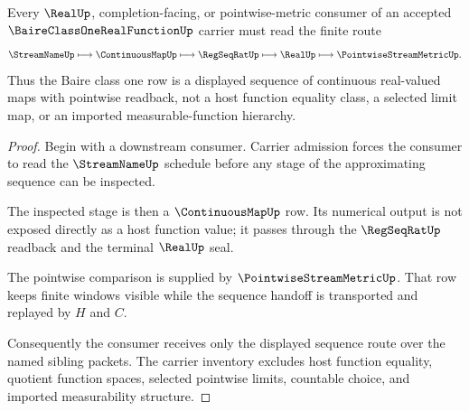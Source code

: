 \begin{theorem}
\label{thm:baire-class-one-real-function-sequence-handoff}
Every $\RealUp$, completion-facing, or pointwise-metric consumer of an accepted $\BaireClassOneRealFunctionUp$ carrier must read the finite route
$$
\StreamNameUp
\longmapsto
\ContinuousMapUp
\longmapsto
\RegSeqRatUp
\longmapsto
\RealUp
\longmapsto
\PointwiseStreamMetricUp .
$$
Thus the Baire class one row is a displayed sequence of continuous real-valued maps with pointwise readback, not a host function equality class, a selected limit map, or an imported measurable-function hierarchy.
\end{theorem}
\begin{proof}
Begin with a downstream consumer. Carrier admission forces the consumer to read the $\StreamNameUp$ schedule before any stage of the approximating sequence can be inspected.

The inspected stage is then a $\ContinuousMapUp$ row. Its numerical output is not exposed directly as a host function value; it passes through the $\RegSeqRatUp$ readback and the terminal $\RealUp$ seal.

The pointwise comparison is supplied by $\PointwiseStreamMetricUp$. That row keeps finite windows visible while the sequence handoff is transported and replayed by $H$ and $C$.

Consequently the consumer receives only the displayed sequence route over the named sibling packets. The carrier inventory excludes host function equality, quotient function spaces, selected pointwise limits, countable choice, and imported measurability structure.
\end{proof}



